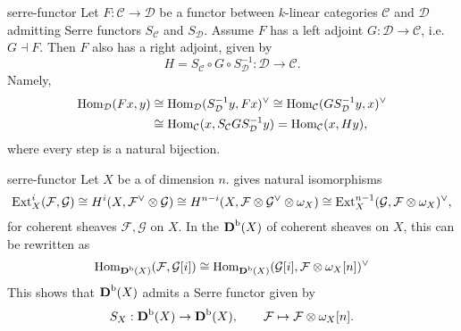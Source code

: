 \begin{example}{serre-functor}
    Let $F : \mathcal{C} \to \mathcal{D}$ be a functor between $k$-linear categories $\mathcal{C}$ and $\mathcal{D}$ admitting Serre functors $S_\mathcal{C}$ and $S_\mathcal{D}$. Assume $F$ has a left adjoint $G : \mathcal{D} \to \mathcal{C}$, i.e. $G \dashv F$. Then $F$ also has a right adjoint, given by
    \[ H = S_\mathcal{C} \circ G \circ S_\mathcal{D}^{-1} : \mathcal{D} \to \mathcal{C} . \]
    Namely,
    \[ \begin{aligned} \operatorname{Hom}_\mathcal{D}(Fx, y) &\cong \operatorname{Hom}_\mathcal{D}(S_\mathcal{D}^{-1} y, Fx)^\vee \cong \operatorname{Hom}_\mathcal{C}(G S_\mathcal{D}^{-1} y, x)^\vee \\ &\cong \operatorname{Hom}_\mathcal{C}(x, S_\mathcal{C} G S_\mathcal{D}^{-1} y) = \operatorname{Hom}_\mathcal{C}(x, H y) , \end{aligned} \]
    where every step is a natural bijection.
\end{example}

\begin{example}{serre-functor}
    Let $X$ be a   of dimension $n$.  gives natural isomorphisms
    \[ \textup{Ext}_X^i(\mathcal{F}, \mathcal{G}) \cong H^i(X, \mathcal{F}^\vee \otimes \mathcal{G}) \cong H^{n - i}(X, \mathcal{F} \otimes \mathcal{G}^\vee \otimes \omega_X) \cong \textup{Ext}_X^{n - 1}(\mathcal{G}, \mathcal{F} \otimes \omega_X)^\vee , \]
    for coherent sheaves $\mathcal{F}, \mathcal{G}$ on $X$. In the  $\textbf{D}^\textup{b}(X)$ of coherent sheaves on $X$, this can be rewritten as
    \[ \operatorname{Hom}_{\textbf{D}^\textup{b}(X)}(\mathcal{F}, \mathcal{G}[i]) \cong \operatorname{Hom}_{\textbf{D}^\textup{b}(X)}(\mathcal{G}[i], \mathcal{F} \otimes \omega_X[n])^\vee \]
    This shows that $\textbf{D}^\textup{b}(X)$ admits a Serre functor given by
    \[ S_X : \textbf{D}^\textup{b}(X) \to \textbf{D}^\textup{b}(X), \qquad \mathcal{F} \mapsto \mathcal{F} \otimes \omega_X[n] . \]
\end{example}
